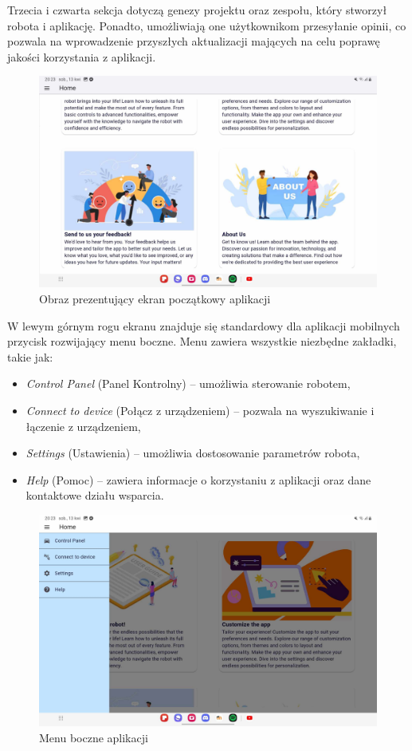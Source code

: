 \documentclass{report}
\begin{document}
Trzecia i czwarta sekcja dotyczą genezy projektu oraz zespołu, który stworzył robota i aplikację. Ponadto, umożliwiają one użytkownikom przesyłanie opinii, co pozwala na wprowadzenie przyszłych aktualizacji mających na celu poprawę jakości korzystania z aplikacji.

\begin{figure}[H]
    \centering
    \includegraphics[width=1.0\textwidth]{src/app/home-2.jpg}
    \caption{Obraz prezentujący ekran początkowy aplikacji}
    \label{fig:home_screen-2}
\end{figure}

W lewym górnym rogu ekranu znajduje się standardowy dla aplikacji mobilnych przycisk rozwijający menu boczne. Menu zawiera wszystkie niezbędne zakładki, takie jak:
\begin{itemize}
\item \textit{Control Panel} (Panel Kontrolny) – umożliwia sterowanie robotem,
\item \textit{Connect to device} (Połącz z urządzeniem) – pozwala na wyszukiwanie i łączenie z urządzeniem,
\item \textit{Settings} (Ustawienia) – umożliwia dostosowanie parametrów robota,
\item \textit{Help} (Pomoc) – zawiera informacje o korzystaniu z aplikacji oraz dane kontaktowe działu wsparcia.
\end{itemize}

\begin{figure}[H]
    \centering
    \includegraphics[width=1.0\textwidth]{src/app/tab-control.jpg}
    \caption{Menu boczne aplikacji}
    \label{fig:side-menu}
\end{figure}
\end{document}
